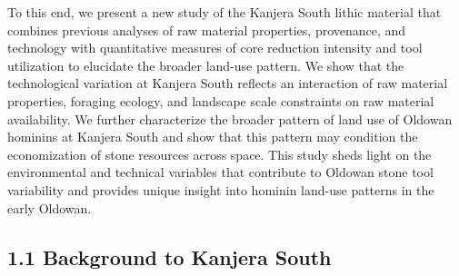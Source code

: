 \documentclass[]{elsarticle} %
\begin{document}
To this end, we present a new study of the Kanjera South lithic material
that combines previous analyses of raw material properties, provenance,
and technology with quantitative measures of core reduction intensity
and tool utilization to elucidate the broader land-use pattern. We show
that the technological variation at Kanjera South reflects an
interaction of raw material properties, foraging ecology, and landscape
scale constraints on raw material availability. We further characterize
the broader pattern of land use of Oldowan hominins at Kanjera South and
show that this pattern may condition the economization of stone
resources across space. This study sheds light on the environmental and
technical variables that contribute to Oldowan stone tool variability
and provides unique insight into hominin land-use patterns in the early
Oldowan.

\hypertarget{background-to-kanjera-south}{%
\subsection{1.1 Background to Kanjera
South}\label{background-to-kanjera-south}}
\end{document}
